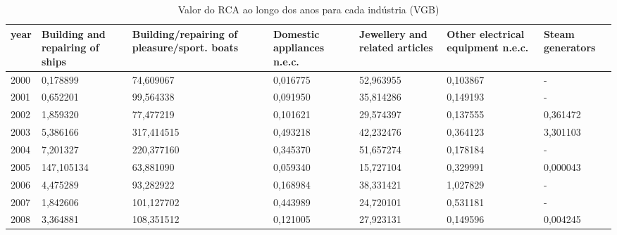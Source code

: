 \begin{table}
\centering
\caption{Valor do RCA ao longo dos anos para cada indústria (VGB)}
\begin{tabular}{p{1cm}p{2cm}p{2cm}p{2cm}p{2cm}p{2cm}p{2cm}}
\toprule
 year &  Building and repairing of ships &  Building/repairing of pleasure/sport. boats &  Domestic appliances n.e.c. &  Jewellery and related articles &  Other electrical equipment n.e.c. &  Steam generators \\
\midrule
 2000 &                         0,178899 &                                    74,609067 &                    0,016775 &                       52,963955 &                           0,103867 &                 - \\
 2001 &                         0,652201 &                                    99,564338 &                    0,091950 &                       35,814286 &                           0,149193 &                 - \\
 2002 &                         1,859320 &                                    77,477219 &                    0,101621 &                       29,574397 &                           0,137555 &          0,361472 \\
 2003 &                         5,386166 &                                   317,414515 &                    0,493218 &                       42,232476 &                           0,364123 &          3,301103 \\
 2004 &                         7,201327 &                                   220,377160 &                    0,345370 &                       51,657274 &                           0,178184 &                 - \\
 2005 &                       147,105134 &                                    63,881090 &                    0,059340 &                       15,727104 &                           0,329991 &          0,000043 \\
 2006 &                         4,475289 &                                    93,282922 &                    0,168984 &                       38,331421 &                           1,027829 &                 - \\
 2007 &                         1,842606 &                                   101,127702 &                    0,443989 &                       24,720101 &                           0,531181 &                 - \\
 2008 &                         3,364881 &                                   108,351512 &                    0,121005 &                       27,923131 &                           0,149596 &          0,004245 \\

\end{tabular}
\end{table}
